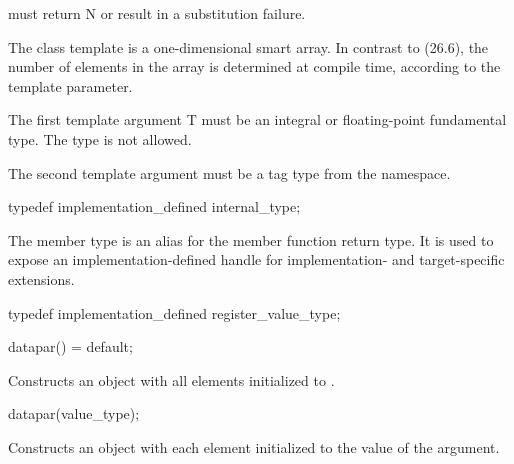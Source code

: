 \begin{wgText}
\begin{itemdescr}
    \pnum
     must return \code N or result in a substitution failure.
  \end{itemdescr}

  

  \pnum The class template \datapar{} is a one-dimensional smart array.
  In contrast to  (26.6), the number of elements in the array is determined at compile time, according to the  template parameter.

  \pnum The first template argument \type T must be an integral or floating-point fundamental type.
  The type \bool is not allowed.

  \pnum The second template argument  must be a tag type from the  namespace.

  \begin{itemdecl}
typedef implementation_defined internal_type;
  \end{itemdecl}
  \begin{itemdescr}
    \pnum
    The  member type is an alias for the  member function return type.
    It is used to expose an implementation-defined handle for implementation- and target-specific extensions.
  \end{itemdescr}

  \begin{itemdecl}
typedef implementation_defined register_value_type;
  \end{itemdecl}
  \begin{itemdescr}
  \end{itemdescr}

  \begin{itemdecl}
datapar() = default;
  \end{itemdecl}
  \begin{itemdescr}
    \pnum
    \effects
    Constructs an object with all elements initialized to .
  \end{itemdescr}

  \begin{itemdecl}
datapar(value_type);
  \end{itemdecl}
  \begin{itemdescr}
    \pnum
    \effects
    Constructs an object with each element initialized to the value of the argument.
  \end{itemdescr}


\end{wgText}

